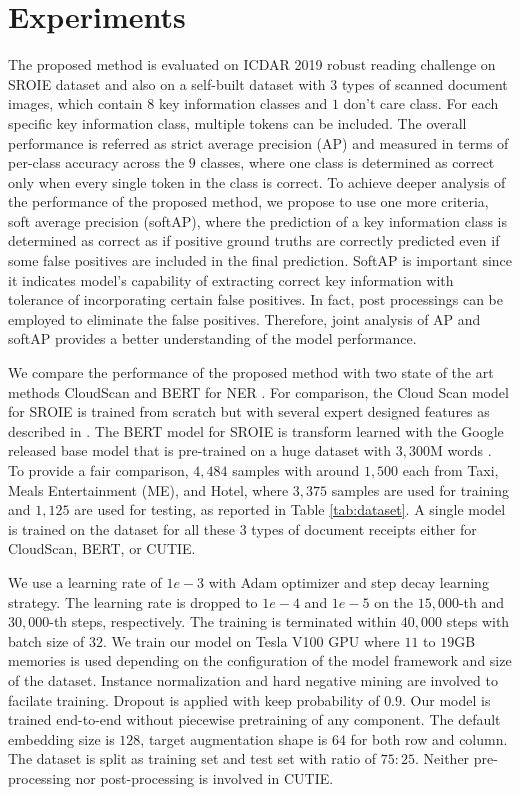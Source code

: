 \documentclass[10pt,twocolumn,letterpaper]{article}
\begin{document}
\section{Experiments}
\label{experiment}
The proposed method is evaluated on ICDAR 2019 robust reading challenge on SROIE dataset and also on a self-built dataset with $3$ types of scanned document images, which contain $8$ key information classes and $1$ don't care class. For each specific key information class, multiple tokens can be included. The overall performance is referred as strict average precision (AP) and measured in terms of per-class accuracy across the $9$ classes, where one class is determined as correct only when every single token in the class is correct. To achieve deeper analysis of the performance of the proposed method, we propose to use one more criteria, soft average precision (softAP), where the prediction of a key information class is determined as correct as if positive ground truths are correctly predicted even if some false positives are included in the final prediction. SoftAP is important since it indicates model's capability of extracting correct key information with tolerance of incorporating certain false positives. In fact, post processings can be employed to eliminate the false positives. Therefore, joint analysis of AP and softAP provides a better understanding of the model performance.

We compare the performance of the proposed method with two state of the art methods CloudScan \cite{cloudscan} and BERT for NER \cite{bert}. For comparison, the Cloud Scan model for SROIE is trained from scratch but with several expert designed features as described in \cite{cloudscan}. The BERT model for SROIE is transform learned with the Google released base model that is pre-trained on a huge dataset with $3,300$M words \cite{bert,bertgit}. To provide a fair comparison, $4,484$ samples with around $1,500$ each from Taxi, Meals Entertainment (ME), and Hotel, where $3,375$ samples are used for training and $1,125$ are used for testing, as reported in Table \ref{tab:dataset}. A single model is trained on the dataset for all these $3$ types of document receipts either for CloudScan, BERT, or CUTIE.

We use a learning rate of $1e-3$ with Adam optimizer and step decay learning strategy. The learning rate is dropped to $1e-4$ and $1e-5$ on the $15,000$-th and $30,000$-th steps, respectively. The training is terminated within $40,000$ steps with batch size of $32$. We train our model on Tesla V100 GPU where $11$ to $19$GB memories is used depending on the configuration of the model framework and size of the dataset. Instance normalization and hard negative mining are involved to facilate training. Dropout is applied with keep probability of $0.9$. Our model is trained end-to-end without piecewise pretraining of any component. The default embedding size is $128$, target augmentation shape is $64$ for both row and column. The dataset is split as training set and test set with ratio of $75:25$. Neither pre-processing nor post-processing is involved in CUTIE.
\end{document}
